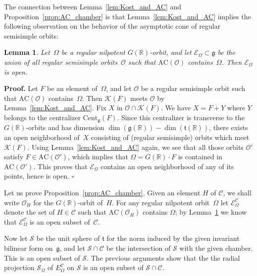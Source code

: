 \documentclass[10pt,leqno]{article}
\newtheorem{lemma}[equation]{Lemma}
\numberwithin{equation}{section}
\newcommand{\qed}{\hfill $\square$ \medskip}
\newenvironment{proof}[1][Proof]{\noindent\textbf{#1.} }{\qed}
\newcommand{\R}{\mathbb R}
\renewcommand{\t}{\mathfrak t}
\newcommand{\g}{\mathfrak g}
\newcommand{\AC}{\mathrm{AC}}
\newcommand{\Kostant}[1]{\mathcal{K}(#1)}
\newcommand{\ECom}{\mathcal{E}^{\mathcal{C}}_\Omega}
\begin{document}
\medskip

The connection between Lemma~\ref{lem:Kost_and_AC} and Proposition~\ref{prop:AC_chamber} is that Lemma~\ref{lem:Kost_and_AC}  implies the  following observation on the behavior of the asymptotic cone of regular semisimple orbits: 

\begin{lemma}\label{lem:AC_containment} Let~$\Omega$ be a regular nilpotent $G(\R)$-orbit, and let $\mathcal{E}_\Omega \subset \g$ be the union of all regular semisimple orbits~$\mathcal{O}$ such that $\AC(\mathcal{O})$ contains~$\Omega$. Then $\mathcal{E}_\Omega$ is open. 
\end{lemma}

\begin{proof}
Let $F$ be an element of~$\Omega$, and let $\mathcal{O}$  be a regular semisimple orbit such that $\AC(\mathcal{O})$ contains~$\Omega$.
Then $\Kostant{F}$ meets $\mathcal{O}$ by  Lemma~\ref{lem:Kost_and_AC}. 
Fix $X$ in $\mathcal{O} \cap \Kostant{F}$.
We have $X =F+Y$ where $Y$ belongs to the centralizer $\mathrm{Cent}_\g(F)$.
Since this centralizer is transverse to the $G(\R)$-orbits and has dimension $\dim(\g(\R))-\dim(\t(\R))$,
there exists an open neighborhood of~$X$ consisting of (regular semisimple) orbits  which meet $\Kostant{F}$.
Using Lemma~\ref{lem:Kost_and_AC} again, we see that all those orbits $\mathcal{O}'$ satisfy $F \in \AC(\mathcal{O}')$,
which implies that $\Omega = G(\R) \cdot F$ is contained in $\AC(\mathcal{O}')$.
This proves that $\mathcal{E}_\Omega$ contains an open neighborhood of any of its points, hence is open.   \end{proof}


Let us prove Proposition~\ref{prop:AC_chamber}. Given an element $H$ of $\mathcal{C}$, we shall write $\mathcal{O}_H$ for the $G(\R)$-orbit of~$H$. For any regular nilpotent orbit~$\Omega$ let $\ECom$  denote the set of $H \in \mathcal{C}$ such that $\AC(\mathcal{O}_H)$ contains $\Omega$; by Lemma~\ref{lem:AC_containment}  we know that   $\ECom$ is an open subset of~$\mathcal{C}$. 

Now let $\mathcal{S}$ be the unit sphere of $\t$ for the norm induced by the given invariant bilinear form on~$\g$, and let $\mathcal{S} \cap \mathcal{C}$ be the intersection of $\mathcal{S}$ with the given chamber. This is an open subset of $\mathcal{S}$. The previous arguments show that the the radial projection $\mathcal{S}_{\Omega}$ of  $E^{\mathcal{C}}_\Omega$ on $\mathcal{S}$ is an open subset of $\mathcal{S} \cap \mathcal{C}$. 
\end{document}
